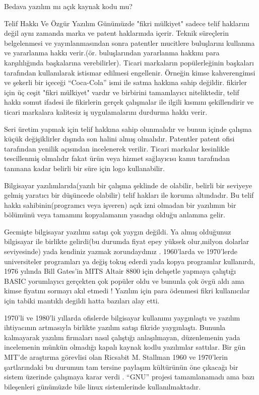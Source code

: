 \documentclass[10pt,a5paper]{book}
\begin{document}
\begin{section}{Bedava yazılım mı açık kaynak kodu mu?}
\begin{subsection}{Telif Hakkı Ve Özgür Yazılım}
Günümüzde "fikri mülkiyet" sadece telif haklarını değil aynı zamanda marka ve patent haklarınıda içerir. Teknik süreçlerin belgelenmesi  ve yayınlanmasından sonra patentler mucitlere buluşlarını kullanma ve yararlanma hakkı verir.(ör. buluşlarından yararlanma hakkını para karşılılığında başkalarına verebilirler). Ticari markaların popülerleğinin başkaları tarafından kullanılarak istismar edilmesi engellenir. Örneğin kimse  kahverengimsi ve şekerli bir içeceği “Coca-Cola” ismi ile satma hakkına sahip değildir. fikirler için üç ceşit "fikri mülkiyet"  vardır ve birbirini tamamlayıcı niteliktedir, telif hakkı somut ifadesi ile fikirlerin gerçek çalışmalar ile ilgili kısmını şekillendirir ve ticari markalara  kalitesiz iş uygulamalarını durdurma hakkı verir.

Seri üretim yapmak için telif hakkına sahip olunmalıdır ve bunun içinde çalışma küçük değişiklirler dışında son halini almış olmalıdır. Patentler patent ofisi tarafından yenilik açısından incelenerek verilir. Ticari markalar kesinlikle tescillenmiş olmalıdır fakat ürün veya hizmet sağlayıcısı kamu tarafından tanınana kadar  belirli bir süre için logo kullanabilir.

Bilgisayar yazılımlarıda(yazılı bir çalışma şeklinde de olabilir, belirli bir seviyeye gelmiş yaratıcı bir düşüncede olabilir) telif hakları ile koruma altındadır. Bu telif hakkı sahibinin(programcı veya işveren) açık izni olmadan bir yazılımın bir bölümünü veya tamamını kopyalamanın yasadışı olduğu anlamına gelir.

Gecmişte bilgisayar yazılımı satışı çok yaygın değildi. Ya almış olduğunuz bilgisayar ile birlikte gelirdi(bu durumda fiyat epey yüksek olur,milyon dolarlar seviyesinde) yada kendiniz yazmak zorundaydınız . 1960'larda ve 1970'lerde universiteler programları ya değiş tokuş ederdi yada kopya programlar kullanırdı, 1976 yılında Bill Gates'in   MITS Altair 8800 için dehşetle yapmaya çalıştığı BASIC yorumlayıcı gerçekten çok popüler oldu ve bununla çok övgü aldı ama kimse fiyatını sormayı akıl etmedi ! Yazılım için para ödenmesi fikri kullanıcılar için tabiki mantıklı degildi hatta bazıları alay etti.

1970'li ve 1980'li yıllarda ofislerde bilgisayar kullanımı yaygınlaştı ve yazılım ihtiyacının artmasıyla birlikte yazılım satışı fikride yaygınlaştı. Bununla kalmayarak yazılım firmaları nasıl çalıştığı anlaşılmayan, düzenlemenin yada incelemenin münkün olmadığı kapalı kaynak kodlu yazılımlar sattılar. Bir gün MIT'de araştırma görevlisi olan Ricsabit M. Stallman 1960 ve 1970'lerin şartlarındaki bu durumun tam tersine paylaşım kültürünün öne çıkacağı bir sistem üzerinde çalışmaya karar verdi . “GNU” projesi tamamlanamadı ama bazı bileşenleri günümüzde bile linux sistemlerinde kullanılmaktadır.


\end{subsection}
\end{section}
\end{document}
